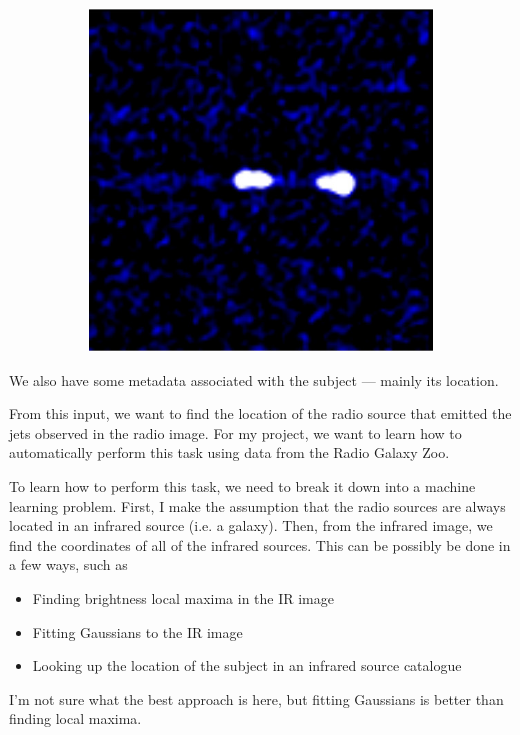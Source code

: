 \documentclass[a4paper]{article}
\begin{document}
\begin{figure}[!ht]
\begin{subfigure}{0.3\textwidth}
            \includegraphics[width=\linewidth]{../images/ARG000180p_radio.jpg}
        \end{subfigure}
    \end{figure}

    We also have some metadata associated with the subject --- mainly its location.

    From this input, we want to find the location of the radio source that emitted the jets observed in the radio image. For my project, we want to learn how to automatically perform this task using data from the Radio Galaxy Zoo.

    To learn how to perform this task, we need to break it down into a machine learning problem. First, I make the assumption that the radio sources are always located in an infrared source (i.e. a galaxy). Then, from the infrared image, we find the coordinates of all of the infrared sources. This can be possibly be done in a few ways, such as
    \begin{itemize}
        \item Finding brightness local maxima in the IR image
        \item Fitting Gaussians to the IR image
        \item Looking up the location of the subject in an infrared source catalogue
    \end{itemize}
    I'm not sure what the best approach is here, but fitting Gaussians is better than finding local maxima.
\end{document}
